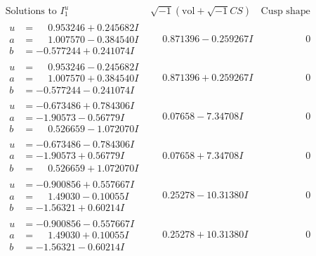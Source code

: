 \documentclass[1p]{elsarticle_modified}
\theoremstyle{definition}
\newcommand{\I}{\sqrt{-1}}
\begin{document}
$$\begin{array}{c|c|c}  
\text{Solutions to }I^u_{1}& \I (\text{vol} + \sqrt{-1}CS) & \text{Cusp shape}\\
 \hline 
\begin{aligned}
u &= \phantom{-}0.953246 + 0.245682 I \\
a &= \phantom{-}1.007570 - 0.384540 I \\
b &= -0.577244 + 0.241074 I\end{aligned}
 & \phantom{-}0.871396 - 0.259267 I & \phantom{-0.000000 } 0 \\ \hline\begin{aligned}
u &= \phantom{-}0.953246 - 0.245682 I \\
a &= \phantom{-}1.007570 + 0.384540 I \\
b &= -0.577244 - 0.241074 I\end{aligned}
 & \phantom{-}0.871396 + 0.259267 I & \phantom{-0.000000 } 0 \\ \hline\begin{aligned}
u &= -0.673486 + 0.784306 I \\
a &= -1.90573 - 0.56779 I \\
b &= \phantom{-}0.526659 - 1.072070 I\end{aligned}
 & \phantom{-}0.07658 - 7.34708 I & \phantom{-0.000000 } 0 \\ \hline\begin{aligned}
u &= -0.673486 - 0.784306 I \\
a &= -1.90573 + 0.56779 I \\
b &= \phantom{-}0.526659 + 1.072070 I\end{aligned}
 & \phantom{-}0.07658 + 7.34708 I & \phantom{-0.000000 } 0 \\ \hline\begin{aligned}
u &= -0.900856 + 0.557667 I \\
a &= \phantom{-}1.49030 - 0.10055 I \\
b &= -1.56321 + 0.60214 I\end{aligned}
 & \phantom{-}0.25278 - 10.31380 I & \phantom{-0.000000 } 0 \\ \hline\begin{aligned}
u &= -0.900856 - 0.557667 I \\
a &= \phantom{-}1.49030 + 0.10055 I \\
b &= -1.56321 - 0.60214 I\end{aligned}
 & \phantom{-}0.25278 + 10.31380 I & \phantom{-0.000000 } 0 \\ \hline\begin{aligned}

\end{aligned}
\end{array}$$
\end{document}

